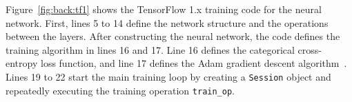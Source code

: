 % 

Figure~\ref{fig:back:tf1} shows the TensorFlow 1.x training code for the neural
network. 
First, lines 5 to 14 define the network structure and the operations between
the layers.
After constructing the neural network, the code defines the training algorithm
in lines 16 and 17.
Line 16 defines the categorical cross-entropy loss function, and line 17
defines the Adam gradient descent algorithm~\cite{kingma2014adam}.
Lines 19 to 22 start the main training loop by creating a {\tt Session} object
and repeatedly executing the training operation {\tt train\_op}.





